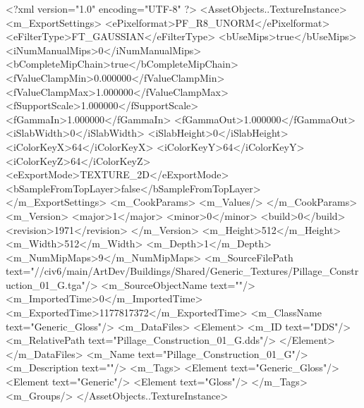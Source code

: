 <?xml version="1.0" encoding="UTF-8" ?>
<AssetObjects..TextureInstance>
	<m_ExportSettings>
		<ePixelformat>PF_R8_UNORM</ePixelformat>
		<eFilterType>FT_GAUSSIAN</eFilterType>
		<bUseMips>true</bUseMips>
		<iNumManualMips>0</iNumManualMips>
		<bCompleteMipChain>true</bCompleteMipChain>
		<fValueClampMin>0.000000</fValueClampMin>
		<fValueClampMax>1.000000</fValueClampMax>
		<fSupportScale>1.000000</fSupportScale>
		<fGammaIn>1.000000</fGammaIn>
		<fGammaOut>1.000000</fGammaOut>
		<iSlabWidth>0</iSlabWidth>
		<iSlabHeight>0</iSlabHeight>
		<iColorKeyX>64</iColorKeyX>
		<iColorKeyY>64</iColorKeyY>
		<iColorKeyZ>64</iColorKeyZ>
		<eExportMode>TEXTURE_2D</eExportMode>
		<bSampleFromTopLayer>false</bSampleFromTopLayer>
	</m_ExportSettings>
	<m_CookParams>
		<m_Values/>
	</m_CookParams>
	<m_Version>
		<major>1</major>
		<minor>0</minor>
		<build>0</build>
		<revision>1971</revision>
	</m_Version>
	<m_Height>512</m_Height>
	<m_Width>512</m_Width>
	<m_Depth>1</m_Depth>
	<m_NumMipMaps>9</m_NumMipMaps>
	<m_SourceFilePath text="//civ6/main/ArtDev/Buildings/Shared/Generic_Textures/Pillage_Construction_01_G.tga"/>
	<m_SourceObjectName text=""/>
	<m_ImportedTime>0</m_ImportedTime>
	<m_ExportedTime>1177817372</m_ExportedTime>
	<m_ClassName text="Generic_Gloss"/>
	<m_DataFiles>
		<Element>
			<m_ID text="DDS"/>
			<m_RelativePath text="Pillage_Construction_01_G.dds"/>
		</Element>
	</m_DataFiles>
	<m_Name text="Pillage_Construction_01_G"/>
	<m_Description text=""/>
	<m_Tags>
		<Element text="Generic_Gloss"/>
		<Element text="Generic"/>
		<Element text="Gloss"/>
	</m_Tags>
	<m_Groups/>
</AssetObjects..TextureInstance>

